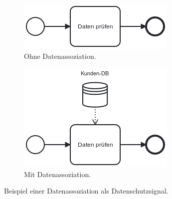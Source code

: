 \begin{figure}[h]
    \centering
    \begin{subfigure}{.5\textwidth}
        \centering
        \includegraphics[width=.7\linewidth]{images/process-models/data-association-example-uncritical}
        \caption{Ohne Datenassoziation.}
        \label{fig:without-data-association}
    \end{subfigure}%
    \begin{subfigure}{.5\textwidth}
        \centering
        \includegraphics[width=.7\linewidth]{images/process-models/data-association-example-critical}
        \caption{Mit Datenassoziation.}
        \label{fig:with-data-association}
    \end{subfigure}
    \caption{Beispiel einer Datenassoziation als Datenschutzsignal.}
    \label{fig:data-association-gdpr-example}
\end{figure}